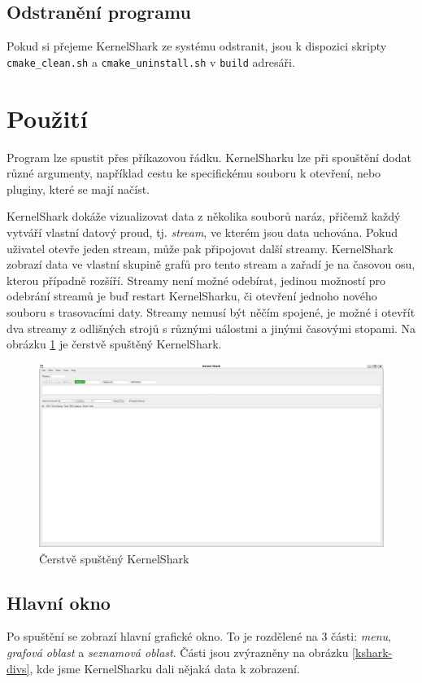 \subsection*{Odstranění programu}

Pokud si přejeme KernelShark ze systému odstranit, jsou k dispozici skripty \texttt{cmake\_clean.sh} a \texttt{cmake\_uninstall.sh} v \texttt{build} adresáři.

\section{Použití}

Program lze spustit přes příkazovou řádku. KernelSharku lze při spouštění dodat různé argumenty, například cestu ke specifickému souboru k otevření, nebo pluginy, které se mají načíst.

KernelShark dokáže vizualizovat data z několika souborů naráz, přičemž každý vytváří vlastní datový proud, tj. \emph{stream}, ve kterém jsou data uchována. Pokud uživatel otevře jeden stream, může pak připojovat další streamy. KernelShark zobrazí data ve vlastní skupině grafů pro tento stream a zařadí je na časovou osu, kterou případně rozšíří. Streamy není možné odebírat, jedinou možností pro odebrání streamů je buď restart KernelSharku, či otevření jednoho nového souboru s trasovacími daty. Streamy nemusí být něčím spojené, je možné i otevřít dva streamy z odlišných strojů s různými uálostmi a jinými časovými stopami. Na obrázku \ref{kshark-empty} je čerstvě spuštěný KernelShark.

\begin{figure}[p]\centering
    \includegraphics[width=140mm]{img/KernelShark/kshark-empty}
    \caption{Čerstvě spuštěný KernelShark}
    \label{kshark-empty}
\end{figure}

\subsection*{Hlavní okno}
Po spuštění se zobrazí hlavní grafické okno. To je rozdělené na 3 části: \emph{menu}, \emph{grafová oblast} a \emph{seznamová oblast}. Části jsou zvýrazněny na obrázku \ref{kshark-divs}, kde jsme KernelSharku dali nějaká data k zobrazení.

